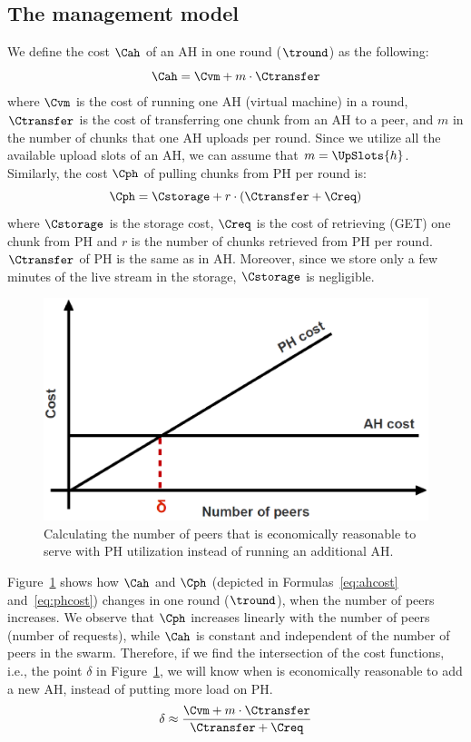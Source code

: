 \subsection{The management model} \label{ahmgt}
We define the cost $\Cah$ of an AH in one round ($\tround$) as the following:
\begin{equation}\label{eq:ahcost}
\Cah = \Cvm + m \cdot \Ctransfer
\end{equation}
where $\Cvm$ is the cost of running one AH (virtual machine) in a round,
$\Ctransfer$ is the cost of transferring one chunk from an AH to a peer, and
$m$ in the number of chunks that one AH uploads per round. Since we utilize
all the available upload slots of an AH, we can assume that $m = \UpSlots{h}$.
Similarly, the cost $\Cph$ of pulling chunks from PH per round is:
\begin{equation}\label{eq:phcost}
\Cph = \Cstorage + r \cdot (\Ctransfer + \Creq) 
\end{equation}
where $\Cstorage$ is the storage cost, $\Creq$ is the cost of retrieving (GET)
one chunk from PH and $r$ is the number of chunks retrieved from PH per round.
$\Ctransfer$ of PH is the same as in AH. Moreover, since we store only a few
minutes of the live stream in the storage, $\Cstorage$ is negligible.
\begin{figure}[t]
\centering
\includegraphics[width=0.7\columnwidth,]{delta}
\caption{\small Calculating the number of peers that is economically reasonable to serve with PH utilization instead of running an additional AH.}
\label{fig:delta}
\end{figure}

Figure~\ref{fig:delta} shows how $\Cah$ and $\Cph$ (depicted in
Formulas~\ref{eq:ahcost} and~\ref{eq:phcost}) changes in one round
($\tround$), when the number of peers increases. We observe that $\Cph$
increases linearly with the number of peers (number of requests), while $\Cah$
is constant and independent of the number of peers in the swarm. Therefore, if
we find the intersection of the cost functions, i.e., the point $\delta$ in
Figure~\ref{fig:delta}, we will know when is economically reasonable to add a
new AH, instead of putting more load on PH.
\begin{equation}\label{eq:delta}
\delta \approx \frac{\Cvm + m \cdot \Ctransfer}{\Ctransfer + \Creq}
\end{equation}

